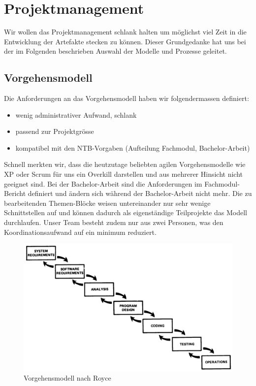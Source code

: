 \section{Projektmanagement}
Wir wollen das Projektmanagement schlank halten um möglichst viel Zeit in die Entwicklung der Artefakte stecken zu können.
Dieser Grundgedanke hat uns bei der im Folgenden beschrieben Auswahl der Modelle und Prozesse geleitet.

\subsection{Vorgehensmodell}

Die Anforderungen an das Vorgehensmodell haben wir folgendermassen definiert:
\begin{itemize}  
\item wenig administrativer Aufwand, schlank
\item passend zur Projektgrösse
\item kompatibel mit den NTB-Vorgaben (Aufteilung Fachmodul, Bachelor-Arbeit)
\end{itemize}

Schnell merkten wir, dass die heutzutage beliebten agilen Vorgehensmodelle wie XP oder Scrum für uns ein Overkill darstellen und aus mehrerer Hinsicht nicht geeignet sind. Bei der Bachelor-Arbeit sind die Anforderungen im Fachmodul-Bericht definiert und ändern sich während der Bachelor-Arbeit nicht mehr. Die zu bearbeitenden Themen-Blöcke weisen untereinander nur sehr wenige Schnittstellen auf und können dadurch als eigenständige Teilprojekte das Modell durchlaufen. Unser Team besteht zudem nur aus zwei Personen, was den Koordinationsaufwand auf ein minimum reduziert.

\begin{figure}[htbp]
	\centering
	\includegraphics[width=0.9\linewidth]{img/royce-largePrograms}
	\caption{Vorgehensmodell nach Royce}
	\label{img:royce-largePrograms}
\end{figure}


